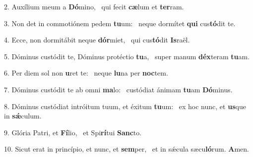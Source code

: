 2. Auxílium meum a \textbf{Dó}mino, \ast\  qui fecit \textbf{cæ}lum et \textbf{ter}ram.\

3. Non det in commotiónem pedem \textbf{tu}um: \ast\  neque dormítet \textbf{qui} cus\textbf{tó}dit te.\

4. Ecce, non dormitábit neque \textbf{dór}miet, \ast\  qui cus\textbf{tó}dit \textbf{Is}raël.\

5. Dóminus custódit te, Dóminus protéctio \textbf{tu}a, \ast\  super manum \textbf{déx}teram \textbf{tu}am.\

6. Per diem sol non \textbf{u}ret te: \ast\  neque \textbf{lu}na per \textbf{noc}tem.\

7. Dóminus custódit te ab omni \textbf{ma}lo: \ast\  custódiat ánimam \textbf{tu}am \textbf{Dó}minus.\

8. Dóminus custódiat intróitum tuum, et éxitum \textbf{tu}um: \ast\  ex hoc nunc, et \textbf{us}que in \textbf{sǽ}culum.\

9. Glória Patri, et \textbf{Fí}lio, \ast\  et Spi\textbf{rí}tui \textbf{Sanc}to.\

10. Sicut erat in princípio, et nunc, et \textbf{sem}per, \ast\  et in sǽcula sæcu\textbf{ló}rum. \textbf{A}men.\

